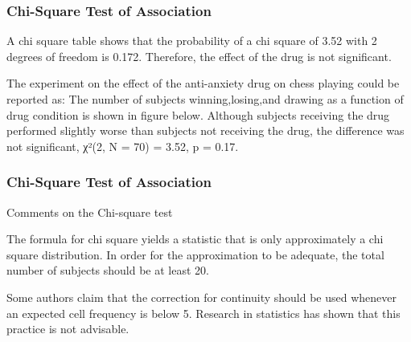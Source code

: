 \begin{frame}
\frametitle{Chi-Square Test of Association}

\Large
A chi square table shows that the probability of a chi square of 3.52 with 2 degrees of freedom is 0.172. Therefore, the effect of the drug is not significant. 
 
 The experiment on the effect of the anti-anxiety drug on chess playing could be reported as:
The number of subjects winning,losing,and drawing as a function of drug condition is shown in figure below. Although subjects receiving the drug performed slightly worse than subjects not receiving the drug, the difference was not significant, χ²(2, N = 70) = 3.52, p = 0.17. 
 
 \end{frame}

\begin{frame}
\frametitle{Chi-Square Test of Association}

\Large

Comments on the Chi-square test 
 
The formula for chi square yields a statistic that is only approximately a chi square distribution. In order for the approximation to be adequate, the total number of subjects should be at least 20.
 
Some authors claim that the correction for continuity should be used whenever an expected cell frequency is below 5. Research in statistics has shown that this practice is not advisable.
 
 \end{frame}

